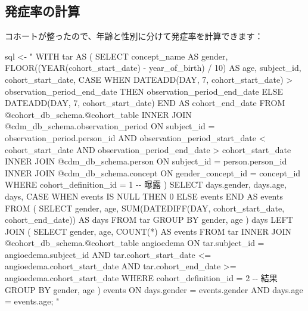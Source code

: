\documentclass[
  11pt]{book}
\newenvironment{Shaded}{\begin{snugshade}}{\end{snugshade}}
\newcommand{\NormalTok}[1]{#1}
\newcommand{\OtherTok}[1]{\textcolor[rgb]{0.56,0.35,0.01}{#1}}
\newcommand{\StringTok}[1]{\textcolor[rgb]{0.31,0.60,0.02}{#1}}
\theoremstyle{definition}
\theoremstyle{definition}
\theoremstyle{definition}
\theoremstyle{definition}
\theoremstyle{remark}
\begin{document}
\subsection{発症率の計算}\label{ux767aux75c7ux7387ux306eux8a08ux7b97}

コホートが整ったので、年齢と性別に分けて発症率を計算できます：

\begin{Shaded}
\begin{Highlighting}[]
\NormalTok{sql }\OtherTok{\textless{}{-}} \StringTok{"}
\StringTok{WITH tar AS (}
\StringTok{  SELECT concept\_name AS gender,}
\StringTok{    FLOOR((YEAR(cohort\_start\_date) {-}}
\StringTok{          year\_of\_birth) / 10) AS age,}
\StringTok{    subject\_id,}
\StringTok{    cohort\_start\_date,}
\StringTok{    CASE WHEN DATEADD(DAY, 7, cohort\_start\_date) \textgreater{}}
\StringTok{      observation\_period\_end\_date}
\StringTok{    THEN observation\_period\_end\_date}
\StringTok{    ELSE DATEADD(DAY, 7, cohort\_start\_date)}
\StringTok{    END AS cohort\_end\_date}
\StringTok{  FROM @cohort\_db\_schema.@cohort\_table}
\StringTok{  INNER JOIN @cdm\_db\_schema.observation\_period}
\StringTok{    ON subject\_id = observation\_period.person\_id}
\StringTok{      AND observation\_period\_start\_date \textless{} cohort\_start\_date}
\StringTok{      AND observation\_period\_end\_date \textgreater{} cohort\_start\_date}
\StringTok{  INNER JOIN @cdm\_db\_schema.person}
\StringTok{    ON subject\_id = person.person\_id}
\StringTok{  INNER JOIN @cdm\_db\_schema.concept}
\StringTok{    ON gender\_concept\_id = concept\_id}
\StringTok{  WHERE cohort\_definition\_id = 1 {-}{-} 曝露}
\StringTok{)}
\StringTok{SELECT days.gender,}
\StringTok{    days.age,}
\StringTok{    days,}
\StringTok{    CASE WHEN events IS NULL THEN 0 ELSE events END AS events}
\StringTok{FROM (}
\StringTok{  SELECT gender,}
\StringTok{    age,}
\StringTok{    SUM(DATEDIFF(DAY, cohort\_start\_date,}
\StringTok{      cohort\_end\_date)) AS days}
\StringTok{  FROM tar}
\StringTok{  GROUP BY gender,}
\StringTok{    age}
\StringTok{) days}
\StringTok{LEFT JOIN (}
\StringTok{  SELECT gender,}
\StringTok{      age,}
\StringTok{      COUNT(*) AS events}
\StringTok{  FROM tar}
\StringTok{  INNER JOIN @cohort\_db\_schema.@cohort\_table angioedema}
\StringTok{    ON tar.subject\_id = angioedema.subject\_id}
\StringTok{      AND tar.cohort\_start\_date \textless{}= angioedema.cohort\_start\_date}
\StringTok{      AND tar.cohort\_end\_date \textgreater{}= angioedema.cohort\_start\_date}
\StringTok{  WHERE cohort\_definition\_id = 2 {-}{-} 結果}
\StringTok{  GROUP BY gender,}
\StringTok{    age}
\StringTok{) events}
\StringTok{ON days.gender = events.gender}
\StringTok{  AND days.age = events.age;}
\StringTok{"}


\end{Highlighting}
\end{Shaded}
\end{document}
